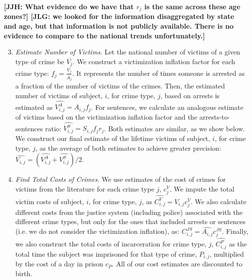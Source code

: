 \documentclass[static]{JJH-Beamer}
\begin{document}
\textbf{[JJH: What evidence do we have that $r_j$ is the same across these age zones?] [JLG: we looked for the information disaggregated by state and age, but that information is not publicly available. There is no evidence to compare to the national trends unfortunately.] }
\clearpage
\begin{frame}

\begin{enumerate}
\setcounter{enumi}{2}
\item \emph{Estimate Number of Victims}. Let the national number of victims of a given type of crime be $\overline{V_j}$. We construct a victimization inflation factor for each crime type: $f_j=\frac{\overline{V_j}}{\overline{A_j}}$. It represents the number of times someone is arrested as a fraction of the number of victims of the crimes. Then, the estimated number of victims of subject, $i$, for crime type, $j$, based on arrests is estimated as $\widehat{V_{i,j}^{A}}=A_{i,j}f_j$. For sentences, we calculate an analogous estimate of victims based on the victimization inflation factor and the arrests-to-sentences ratio: $\widehat{V_{i,j}^{S}}=S_{i,j}f_j r_j$. Both estimates are similar, as we show below. We construct our final estimate of the lifetime victims of subject, $i$, for crime type, $j$, as the average of both estimates to achieve greater precision: $\widehat{V_{i,j}}=\left(\widehat{V_{i,j}^A}+\widehat{V_{i,j}^S}\right)/2$.
\end{enumerate}

\end{frame}

\begin{frame}

\begin{enumerate}
\setcounter{enumi}{3}
\item \emph{Find Total Costs of Crimes}. We use estimates of the cost of crimes for victims from the literature for each crime type $j$, $c_j^V$. We impute the total victim costs of subject, $i$, for crime type, $j$, as $\widehat{C_{i,j}^V}=\widehat{V_{i,j}} c_j^V$. We also calculate different costs from the justice system (including police) associated with the different crime types, but only for the ones that included arrests or sentences (i.e. we do not consider the victimization inflation), as: $C_{i,j}^{JS}=\widehat{A_{i,j}} c_j^{JS}$. Finally, we also construct the total costs of incarceration for crime type, $j$, $\widehat{C_{i,j}^{P}}$ as the total time the subject was imprisoned for that type of crime, $P_{i,j}$, multiplied by the cost of a day in prison $c_P$. All of our cost estimates are discounted to birth.
\end{enumerate}

\end{frame}
\end{document}
